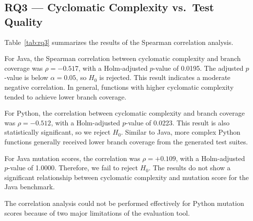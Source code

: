\subsection{RQ3 --- Cyclomatic Complexity vs.\ Test Quality}
\label{subsec:rq3}

Table~\ref{tab:rq3} summarizes the results of the Spearman correlation analysis.

\begin{table}[ht]
\centering
\caption{RQ3: Spearman Correlation --- CC vs.\ Test Quality (Holm-corrected)}
\label{tab:rq3}
\end{table}

For Java, the Spearman correlation between cyclomatic complexity and branch coverage was $\rho = -0.517$, with a Holm-adjusted $p$-value of 0.0195. The adjusted $p$-value is below $\alpha = 0.05$, so $H_0$ is rejected. This result indicates a moderate negative correlation. In general, functions with higher cyclomatic complexity tended to achieve lower branch coverage.

For Python, the correlation between cyclomatic complexity and branch coverage was $\rho = -0.512$, with a Holm-adjusted $p$-value of 0.0223. This result is also statistically significant, so we reject $H_0$. Similar to Java, more complex Python functions generally received lower branch coverage from the generated test suites.

For Java mutation scores, the correlation was $\rho = +0.109$, with a Holm-adjusted $p$-value of 1.0000. Therefore, we fail to reject $H_0$. The results do not show a significant relationship between cyclomatic complexity and mutation score for the Java benchmark.

The correlation analysis could not be performed effectively for Python mutation scores because of two major limitations of the evaluation tool.

